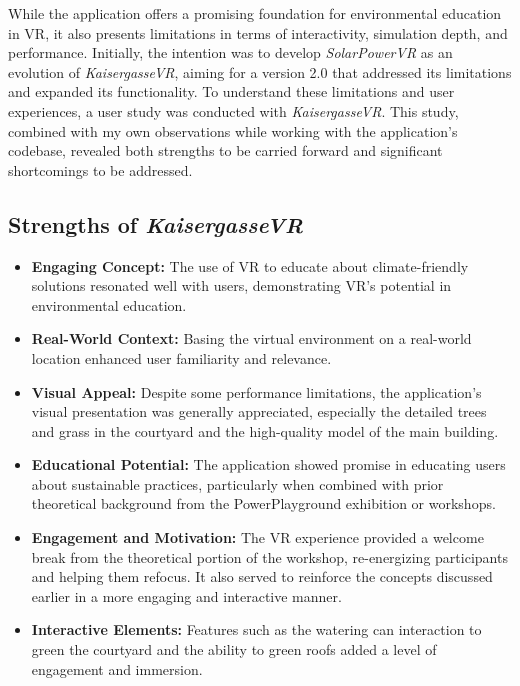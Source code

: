\documentclass[draft, final]{vutinfth} %
\begin{document}
While the application offers a promising foundation for environmental education in VR, it also presents limitations in terms of interactivity, simulation depth, and performance. Initially, the intention was to develop \textit{SolarPowerVR} as an evolution of \textit{KaisergasseVR}, aiming for a version 2.0 that addressed its limitations and expanded its functionality. To understand these limitations and user experiences, a user study was conducted with \textit{KaisergasseVR}. This study, combined with my own observations while working with the application's codebase, revealed both strengths to be carried forward and significant shortcomings to be addressed.

\subsection{Strengths of \textit{KaisergasseVR}}
\begin{itemize}
    \item \textbf{Engaging Concept:} The use of VR to educate about climate-friendly solutions resonated well with users, demonstrating VR's potential in environmental education.
    \item \textbf{Real-World Context:} Basing the virtual environment on a real-world location enhanced user familiarity and relevance.
    \item \textbf{Visual Appeal:} Despite some performance limitations, the application's visual presentation was generally appreciated, especially the detailed trees and grass in the courtyard and the high-quality model of the main building.
    \item \textbf{Educational Potential:} The application showed promise in educating users about sustainable practices, particularly when combined with prior theoretical background from the PowerPlayground exhibition or workshops.
    \item \textbf{Engagement and Motivation:} The VR experience provided a welcome break from the theoretical portion of the workshop, re-energizing participants and helping them refocus. It also served to reinforce the concepts discussed earlier in a more engaging and interactive manner.
    \item \textbf{Interactive Elements:} Features such as the watering can interaction to green the courtyard and the ability to green roofs added a level of engagement and immersion.
\end{itemize}
\end{document}
